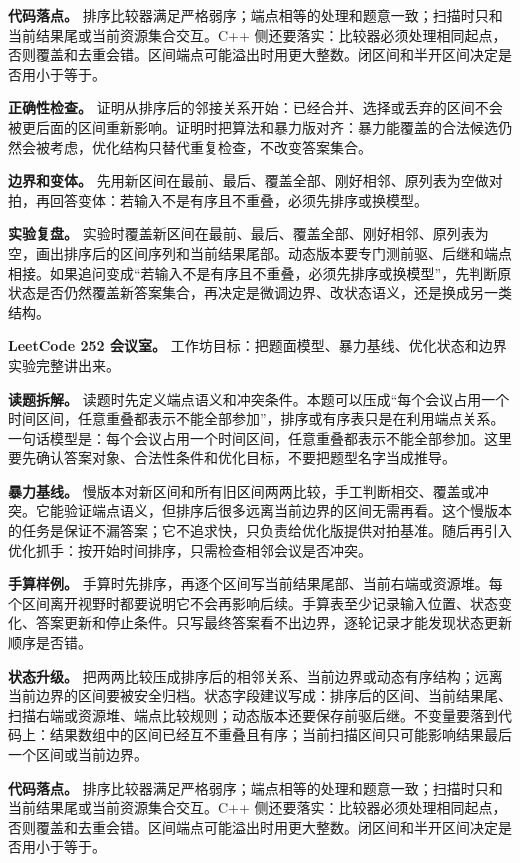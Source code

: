 \textbf{代码落点。} 排序比较器满足严格弱序；端点相等的处理和题意一致；扫描时只和当前结果尾或当前资源集合交互。C++ 侧还要落实：比较器必须处理相同起点，否则覆盖和去重会错。区间端点可能溢出时用更大整数。闭区间和半开区间决定是否用小于等于。

\textbf{正确性检查。} 证明从排序后的邻接关系开始：已经合并、选择或丢弃的区间不会被更后面的区间重新影响。证明时把算法和暴力版对齐：暴力能覆盖的合法候选仍然会被考虑，优化结构只替代重复检查，不改变答案集合。

\textbf{边界和变体。} 先用新区间在最前、最后、覆盖全部、刚好相邻、原列表为空做对拍，再回答变体：若输入不是有序且不重叠，必须先排序或换模型。

\textbf{实验复盘。} 实验时覆盖新区间在最前、最后、覆盖全部、刚好相邻、原列表为空，画出排序后的区间序列和当前结果尾部。动态版本要专门测前驱、后继和端点相接。如果追问变成“若输入不是有序且不重叠，必须先排序或换模型”，先判断原状态是否仍然覆盖新答案集合，再决定是微调边界、改状态语义，还是换成另一类结构。

\noindent\textbf{LeetCode 252 会议室。} 工作坊目标：把题面模型、暴力基线、优化状态和边界实验完整讲出来。

\textbf{读题拆解。} 读题时先定义端点语义和冲突条件。本题可以压成“每个会议占用一个时间区间，任意重叠都表示不能全部参加”，排序或有序表只是在利用端点关系。一句话模型是：每个会议占用一个时间区间，任意重叠都表示不能全部参加。这里要先确认答案对象、合法性条件和优化目标，不要把题型名字当成推导。

\textbf{暴力基线。} 慢版本对新区间和所有旧区间两两比较，手工判断相交、覆盖或冲突。它能验证端点语义，但排序后很多远离当前边界的区间无需再看。这个慢版本的任务是保证不漏答案；它不追求快，只负责给优化版提供对拍基准。随后再引入优化抓手：按开始时间排序，只需检查相邻会议是否冲突。

\textbf{手算样例。} 手算时先排序，再逐个区间写当前结果尾部、当前右端或资源堆。每个区间离开视野时都要说明它不会再影响后续。手算表至少记录输入位置、状态变化、答案更新和停止条件。只写最终答案看不出边界，逐轮记录才能发现状态更新顺序是否错。

\textbf{状态升级。} 把两两比较压成排序后的相邻关系、当前边界或动态有序结构；远离当前边界的区间要被安全归档。状态字段建议写成：排序后的区间、当前结果尾、扫描右端或资源堆、端点比较规则；动态版本还要保存前驱后继。不变量要落到代码上：结果数组中的区间已经互不重叠且有序；当前扫描区间只可能影响结果最后一个区间或当前边界。

\textbf{代码落点。} 排序比较器满足严格弱序；端点相等的处理和题意一致；扫描时只和当前结果尾或当前资源集合交互。C++ 侧还要落实：比较器必须处理相同起点，否则覆盖和去重会错。区间端点可能溢出时用更大整数。闭区间和半开区间决定是否用小于等于。

